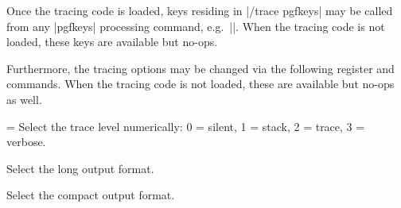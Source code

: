 \begin{command}{\tracepgfkeys{}}
  Once the tracing code is loaded, keys residing in |/trace pgfkeys| may be
  called from any |pgfkeys| processing command, e.g.\ |\tikzset|.  When the
  tracing code is not loaded, these keys are available but no-ops.

\end{command}

Furthermore, the tracing options may be changed via the following register and
commands.  When the tracing code is not loaded, these are available but no-ops
as well.

\begin{command}{\tracingpgfkeys=}
  Select the trace level numerically: 0 = silent, 1 = stack, 2 = trace, 3 =
  verbose.
\end{command}

\begin{command}{\tracingpgfkeyslong}
  Select the long output format.
\end{command}

\begin{command}{\tracingpgfkeyscompact}
  Select the compact output format.
\end{command}
